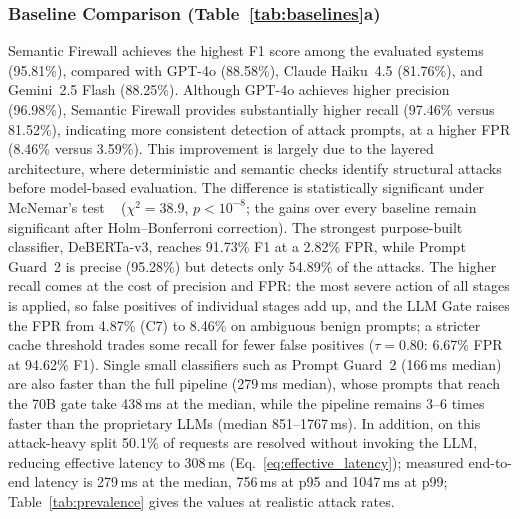 \documentclass[runningheads]{llncs}
\newif\ifrev
\newcommand{\rev}[1]{\ifrev\hl{#1}\else#1\fi}                  %
\begin{document}
\subsubsection{Baseline Comparison (Table~\ref{tab:baselines}a)}
Semantic Firewall achieves the highest F1 score among the evaluated
systems (\rev{95.81\%}), compared with GPT-4o (\rev{88.58\%}), \rev{Claude Haiku~4.5
(81.76\%)}, and Gemini~2.5 Flash (\rev{88.25\%}). Although GPT-4o achieves
higher precision (\rev{96.98\%}), Semantic Firewall provides substantially
higher recall (\rev{97.46\%} versus \rev{81.52\%}), indicating more consistent
detection of attack prompts\rev{, at a higher FPR (8.46\% versus 3.59\%)}. This improvement is largely due to the
layered architecture, where deterministic and semantic checks identify
structural attacks before model-based evaluation. The difference is
statistically significant under McNemar's test ~\cite{McNemar}
(\rev{$\chi^2=38.9$, $p<10^{-8}$; the gains over every baseline remain significant after Holm--Bonferroni correction}). \rev{The strongest purpose-built classifier, DeBERTa-v3, reaches 91.73\% F1 at a 2.82\% FPR, while Prompt Guard~2 is precise (95.28\%) but detects only 54.89\% of the attacks.} \rev{The higher recall comes at the cost of precision and FPR: the most severe action of all stages is applied, so false positives of individual stages add up, and the LLM Gate raises the FPR from 4.87\% (C7) to 8.46\% on ambiguous benign prompts; a stricter cache threshold trades some recall for fewer false positives ($\tau=0.80$: 6.67\% FPR at 94.62\% F1). Single small classifiers such as Prompt Guard~2 (166\,ms median) are also faster than the full pipeline (279\,ms median), whose prompts that reach the 70B gate take 438\,ms at the median, while the pipeline remains 3--6 times faster than the proprietary LLMs (median 851--1767\,ms).} In addition, \rev{on this attack-heavy split} \rev{50.1\%} of requests are
resolved \rev{without invoking the LLM}, reducing effective latency
to \rev{308\,ms (Eq.~\eqref{eq:effective_latency}); measured end-to-end latency is 279\,ms at the median, 756\,ms at p95 and 1047\,ms at p99; Table~\ref{tab:prevalence} gives the values at realistic attack rates}.
\end{document}
